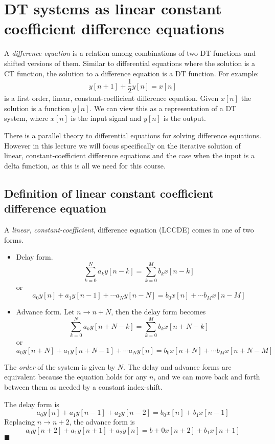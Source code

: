 \chapter{DT systems as linear constant coefficient difference equations}

A \emph{difference equation} is a relation among combinations of two DT functions and shifted versions of them. Similar to differential equations where the solution is a CT function, the solution to a difference equation is a DT function. For example:
\[                         
y[n+1] + \frac{1}{2}y[n] = x[n] 
\]
is a first order, linear, constant-coefficient difference equation. Given $x[n]$ the solution is a function $y[n]$. We can view this as a representation of a DT system, where $x[n]$ is the input signal and $y[n]$ is the output.

There is a parallel theory to differential equations for solving difference equations. However in this lecture we will focus specifically on the iterative solution of linear, constant-coefficient difference equations and the case when the input is a delta function, as this is all we need for this course.

\section{Definition of linear constant coefficient difference equation}

A \emph{linear}, \emph{constant-coefficient}, difference equation (LCCDE) comes in one of two forms.

\begin{itemize}
  \item Delay form. 
  \[    
  \sum\limits_{k = 0}^N a_k y[n-k] = \sum\limits_{k = 0}^M b_k x[n-k]
  \]
  or
  \[
  a_0y[n] + a_1y[n-1] + \cdots a_N y[n-N] = b_0 x[n] + \cdots b_Mx[n-M]
  \]
  
\item Advance form. Let $n\rightarrow n+N$, then the delay form becomes
  \[    
  \sum\limits_{k = 0}^N a_k y[n+N-k] = \sum\limits_{k = 0}^M b_k x[n+N-k]
  \]
  or 
  \[
  a_0y[n+N] + a_1y[n+N-1] + \cdots a_N y[n] = b_0 x[n+N] + \cdots b_Mx[n+N-M]
  \]
\end{itemize}

The {\it order} of the system is given by $N$. The delay and advance forms are equivalent because the equation holds for any $n$, and we can move back and forth between them as needed by a constant index-shift.

\begin{example}[$N=2$, $M=1$]
  The delay form is
  \[
  a_0y[n] + a_1 y[n-1] + a_2 y[n-2] = b_0 x[n] + b_1 x[n-1]
  \]
  Replacing $n \rightarrow n+2$, the advance form is
  \[
  a_0 y[n+2] + a_1 y[n+1] + a_2 y[n] = b+0 x[n+2] + b_1 x[n+1]
  \]
  $\blacksquare$
\end{example}

